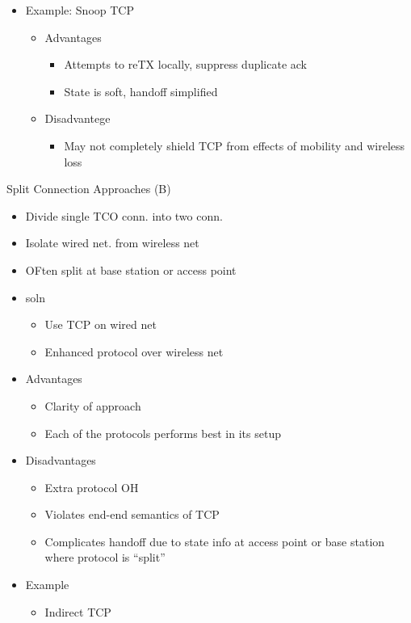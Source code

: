 \documentclass[a4paper]{article}
\begin{document}
\begin{itemize}
	\item Example: Snoop TCP
	\begin{itemize}
		\item Advantages
		\begin{itemize}
			\item Attempts to reTX locally, suppress duplicate ack
			\item State is soft, handoff simplified
		\end{itemize}
		\item Disadvantege
		\begin{itemize}
			\item May not completely shield TCP from effects of
				mobility and wireless loss
		\end{itemize}
	\end{itemize}
\end{itemize}
Split Connection Approaches (B)
\begin{itemize}
	\item Divide single TCO conn. into two conn.
	\item Isolate wired net. from wireless net
	\item OFten split at base station or access point
	\item soln
	\begin{itemize}
		\item Use TCP on wired net
		\item Enhanced protocol over wireless net
	\end{itemize}
	\item Advantages
		\begin{itemize}
			\item Clarity of approach
			\item Each of the protocols performs best in its setup
		\end{itemize}
	\item Disadvantages
	\begin{itemize}
		\item Extra protocol OH
		\item Violates end-end semantics of TCP
		\item Complicates handoff due to state info at access point or
			base station where protocol is ``split''
	\end{itemize}
	\item Example
	\begin{itemize}
		\item Indirect TCP
	\end{itemize}
\end{itemize}
\end{document}
